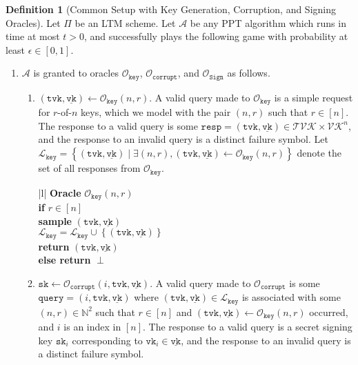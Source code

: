 \documentclass[11pt]{article}
\theoremstyle{definition}
\newtheorem{definition}[definition]{Definition}
\newcommand{\sk}{\texttt{sk}}
\newcommand{\vk}{\texttt{vk}}
\newcommand{\tvk}{\texttt{tvk}}
\newcommand{\VK}{\underline{\texttt{vk}}}
\newcommand{\bbn}{\mathbb{N}}
\newcommand{\sign}{\texttt{Sign}}
\newcommand{\corruptionOracle}{\mathcal{O}_{\texttt{corrupt}}}
\newcommand{\signingOracle}{\mathcal{O}_{\sign}}
\newcommand{\keyOracle}{\mathcal{O}_{\texttt{key}}}
\newcommand{\challengeKeySet}{\mathcal{L}_{\texttt{key}}}
\begin{document}
\begin{definition}[Common Setup with Key Generation, Corruption, and Signing Oracles]\label{def:common_setup}
Let $\Pi$ be an LTM scheme. Let $\mathcal{A}$ be any PPT algorithm which runs in time at most $t > 0$, and successfully plays the following game with probability at least $\epsilon \in [0,1]$.
\begin{enumerate}
\item $\mathcal{A}$ is granted to oracles $\keyOracle$, $\corruptionOracle$, and $\signingOracle$ as follows.
\begin{enumerate}

\item $(\tvk, \VK) \leftarrow \keyOracle(n, r).$ A valid query made to $\mathcal{O}_{\texttt{key}}$ is a simple request for $r$-of-$n$ keys, which we model with the pair $(n, r)$ such that $r \in [n]$. The response to a valid query is some $\texttt{resp} = (\tvk, \VK) \in \mathcal{TVK} \times \mathcal{VK}^n$, and the response to an invalid query is a distinct failure symbol. Let $\challengeKeySet = \left\{(\tvk, \VK) \mid \exists (n, r), (\tvk, \VK) \leftarrow \keyOracle(n, r)\right\}$ denote the set of all responses from $\keyOracle$.

\begin{oracle}
    \centering
        \begin{tabular}{|l|}
        \hline
          {\textbf{Oracle} $\keyOracle(n,r)$} \\
        \hline 
        \textbf{if} $r \in [n]$ \\  
        \quad \quad \textbf{sample} $(\tvk, \VK)$ \\
        \quad \quad $\challengeKeySet = \challengeKeySet \cup \left\{(\tvk, \VK)\right\}$ \\
        \quad \quad \textbf{return} $(\tvk, \VK)$ \\
        \textbf{else return} $\perp$ \\
        \hline
        \end{tabular}
\caption{The key generation oracle in the game of common setup.}
\label{oracle:key}
\end{oracle}

\item $\sk \leftarrow \corruptionOracle(i, \tvk, \VK).$ A valid query made to $\corruptionOracle$ is some $\texttt{query}=(i, \tvk, \VK)$ where $(\tvk, \VK) \in \challengeKeySet$ is associated with some $(n, r) \in \bbn^2$ such that $r \in [n]$ and $(\tvk, \VK) \leftarrow \keyOracle(n,r)$ occurred, and $i$ is an index in $[n]$. The response to a valid query is a secret signing key $\sk_i$ corresponding to $\vk_i \in \VK$, and the response to an invalid query is a distinct failure symbol. 


\end{enumerate}
\end{enumerate}
\end{definition}
\end{document}
